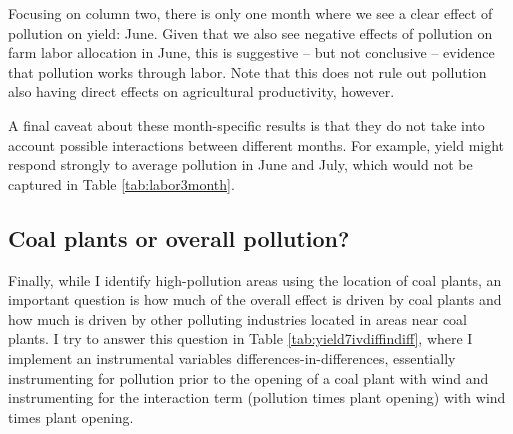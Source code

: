 \documentclass[
]{article}
\begin{document}
Focusing on column two, there is only one month where we see a clear effect of pollution on yield: June. Given that we also see negative effects of pollution on farm labor allocation in June, this is suggestive -- but not conclusive -- evidence that pollution works through labor. Note that this does not rule out pollution also having direct effects on agricultural productivity, however.

A final caveat about these month-specific results is that they do not take into account possible interactions between different months. For example, yield might respond strongly to average pollution in June and July, which would not be captured in Table \ref{tab:labor3month}.

\hypertarget{coal-plants-or-overall-pollution}{%
\subsection{Coal plants or overall pollution?}\label{coal-plants-or-overall-pollution}}

Finally, while I identify high-pollution areas using the location of coal plants, an important question is how much of the overall effect is driven by coal plants and how much is driven by other polluting industries located in areas near coal plants. I try to answer this question in Table \ref{tab:yield7ivdiffindiff}, where I implement an instrumental variables differences-in-differences, essentially instrumenting for pollution prior to the opening of a coal plant with wind and instrumenting for the interaction term (pollution times plant opening) with wind times plant opening.
\end{document}
